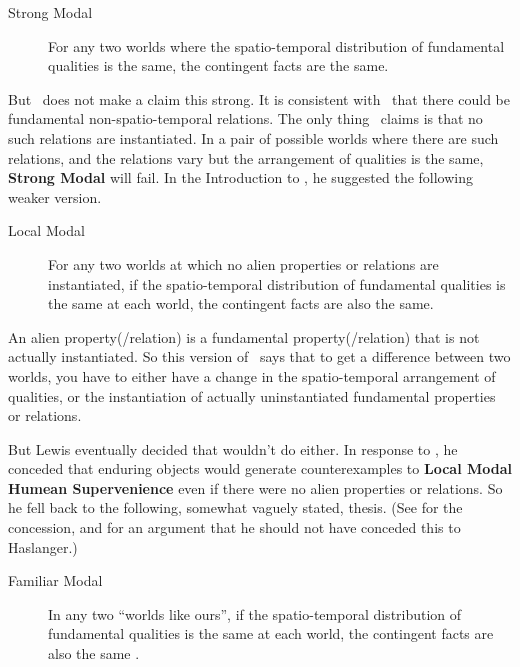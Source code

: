 \begin{description}
\item[Strong Modal \HS] For any two worlds where the spatio-temp\-oral distribution of fundamental qualities is the same, the contingent facts are the same.
\end{description}

\noindent But \HS\ does not make a claim this strong. It is consistent with \HS\ that there could be fundamental non-spatio-temporal relations. The only thing \HS\ claims is that no such relations are instantiated. In a pair of possible worlds where there are such relations, and the relations vary but the arrangement of qualities is the same, \textbf{Strong Modal \HS} will fail. In the Introduction to \citet{Lewis1986b}, he suggested the following weaker version.

\begin{description}
\item[Local Modal \HS] For any two worlds at which no alien properties or relations are instantiated, if the spatio-temporal distribution of fundamental qualities is the same at each world, the contingent facts are also the same.
\end{description}

\noindent An alien property(/relation) is a fundamental property(/relation) that is not actually instantiated. So this version of \HS\ says that to get a difference between two worlds, you have to either have a change in the spatio-temporal arrangement of qualities, or the instantiation of actually uninstantiated fundamental properties or relations.

But Lewis eventually decided that wouldn't do either. In response to \citet{Haslanger1994}, he conceded that enduring objects would generate counter\-examples to \textbf{Local Modal Hu\-m\-ean Supervenience} even if there were no alien properties or relations. So he fell back to the following, somewhat vaguely stated, thesis. (See \citet{Lewis1994a} for the concession, and \citet{Hall2010} for an argument that he should not have conceded this to Haslanger.)

\begin{description}
\item[Familiar Modal \HS] In any two ``worlds like ours'', if the spatio-temp\-oral distribution of fundamental qualities is the same at each world, the contingent facts are also the same  \citep[475]{Lewis1994a}.
\end{description}

